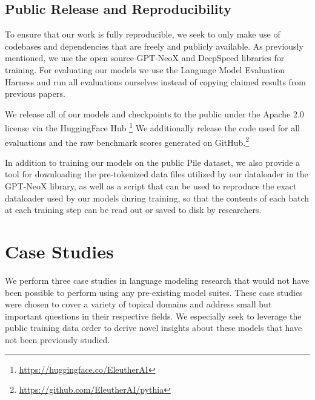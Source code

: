 \documentclass{article}
\theoremstyle{plain}
\theoremstyle{definition}
\theoremstyle{remark}
\begin{document}
\subsection{Public Release and Reproducibility}



To ensure that our work is fully reproducible, we seek to only make use of codebases and dependencies that are freely and publicly available. As previously mentioned, we use the open source GPT-NeoX and DeepSpeed libraries for training. For evaluating our models we use the Language Model Evaluation Harness \citep{gao2021eval} and run all evaluations ourselves instead of copying claimed results from previous papers.

We release all of our models and checkpoints to the public under the Apache 2.0 license via the HuggingFace Hub \citep{wolf2019huggingface}\footnote{\url{https://huggingface.co/EleutherAI}}
We additionally release the code used for all evaluations and the raw benchmark scores generated on GitHub.\footnote{\url{https://github.com/EleutherAI/pythia}}


In addition to training our models on the public Pile dataset,
we also provide a tool for downloading the pre-tokenized data files utilized by our dataloader in the GPT-NeoX library, as well as a script that can be used to reproduce the exact dataloader used by our models during training, so that the contents of each batch at each training step can be read out or saved to disk by researchers.

\section{Case Studies}\label{sec:case-studies}

We perform three case studies in language modeling research that would not have been possible to perform using any pre-existing model suites. These case studies were chosen to cover a variety of topical domains and address small but important questions in their respective fields. We especially seek to leverage the public training data order to derive novel insights about these models that have not been previously studied.
\end{document}
